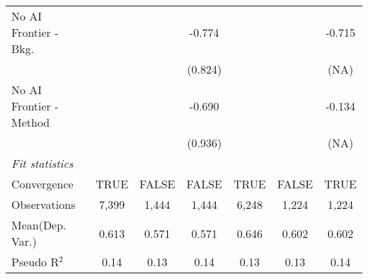 \begin{tabular}{lcccccc}
   No AI Frontier - Bkg.   &        &         & -0.774       &        &        & -0.715\\   
                           &        &         & (0.824)      &        &        & (NA)\\   
   No AI Frontier - Method &        &         & -0.690       &        &        & -0.134\\   
                           &        &         & (0.936)      &        &        & (NA)\\   
   \midrule
   \emph{Fit statistics}\\
   Convergence             &TRUE    & FALSE   & FALSE        & TRUE   & FALSE  & TRUE\\  
   Observations            & 7,399  & 1,444   & 1,444        & 6,248  & 1,224  & 1,224\\  
Mean(Dep. Var.) & 0.613 & 0.571 & 0.571 & 0.646 & 0.602 & 0.602 \\
   Pseudo R$^2$            & 0.14   & 0.13    & 0.14         & 0.13   & 0.13   & 0.14\\  
   

\end{tabular}
